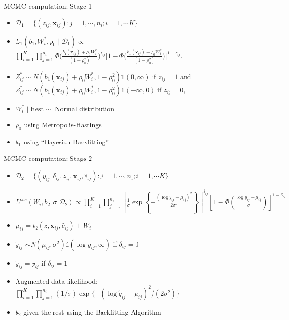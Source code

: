 \documentclass{beamer}
\begin{document}
\begin{frame}{MCMC computation: Stage 1}
    \begin{itemize}
      \vfill \item  $\mathcal{D}_1=\{(z_{ij},\mathbf{x}_{ij}): j=1,\cdots, n_i; i=1,\cdots K\}$ 
          \vfill \item $ 
  L_1(b_1,W^*_i,\rho_0 \mid \mathcal{D}_1)
  \propto$ \\  $ \prod_{i=1}^K\prod_{j=1}^{n_i}
    \Phi\bigl(\frac{b_1(\mathbf{x}_{ij})+\rho_0 W^*_i}{(1-\rho_0^2)}\bigr) ^{z_{ij}}
     \bigl[1-\Phi\bigl(\frac{b_1(\mathbf{x}_{ij})+\rho_0 W^*_i}{(1-\rho_0^2)}\bigr) \bigr]^{1-z_{ij}}.
$ \pause
    \vfill \item $Z_{ij}^* \sim N(b_1(\mathbf{x}_{ij}) + \rho_0 W_i^*, 1-\rho_0^2)\mathds{1}(0, \infty)$ if $z_{ij} = 1$ and $Z_{ij}^* \sim N(b_1(\mathbf{x}_{ij}) + \rho_0 W_i^*, 1-\rho_0^2)\mathds{1}(-\infty, 0)$ if $z_{ij} = 0$, 
    \vfill \item $W_i^* \mid \text{Rest} \sim$ Normal distribution  \vfill \item  $\rho_0$ using Metropolis-Hastings
    \vfill \item   $b_1$ using ``Bayesian Backfitting'' 
 
    \end{itemize}
\end{frame}
\begin{frame}{MCMC computation: Stage 2}
\begin{itemize}
 \vfill \item $\mathcal{D}_2=\{(y_{ij},\delta_{ij},z_{ij},\mathbf{x}_{ij},\hat{e}_{ij}): j=1,\cdots, n_i; i=1,\cdots K\}$
   \vfill \item $L^{obs}(W_i, b_2,\sigma\vert \mathcal{D}_2) \propto \prod_{i=1}^K\prod_{j=1}^{n_i} \left[\frac{1}{\sigma} \exp\left\{-\frac{(\log y_{ij} - \mu_{ij})^2}{2\sigma^2}\right\}\right]^{\delta_{ij}} \left[1 - \Phi\left(\frac{\log y_{ij} - \mu_{ij}}{\sigma}\right)\right]^{1-\delta_{ij}}$
    \vfill \item $\mu_{ij} = b_2(z, \mathbf{x}_{ij}, \hat{e}_{ij}) + W_i $
   \pause
     \vfill \item $\tilde{y}_{ij}$ $\sim N(\mu_{ij}, \sigma^2)\mathds{1}(\log y_{ij}, \infty)$ if $\delta_{ij} = 0$
     \vfill \item $\tilde{y}_{ij}=y_{ij}$ if $\delta_{ij} = 1$
    
     \vfill \item Augmented data likelihood: $\prod_{i=1}^K\prod_{j=1}^{n_i}(1/\sigma)\exp\{-(\log \tilde{y}_{ij}-\mu_{ij})^2/(2\sigma^2)\}$

     \vfill \item $b_2$ given the rest using the Backfitting Algorithm
\end{itemize}
  
\end{frame}
\end{document}
